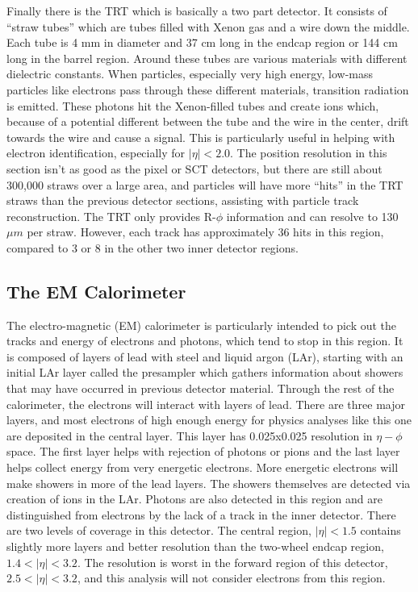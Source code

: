 Finally there is the TRT which is basically a two part detector.  It consists of ``straw tubes'' which are tubes filled with Xenon gas and a wire down the middle. Each tube is 4 mm in diameter and 37 cm long in the endcap region or 144 cm long in the barrel region.   Around these tubes are various materials with different dielectric constants.  When particles, especially very high energy, low-mass particles like electrons pass through these different materials, transition radiation is emitted.  These photons hit the Xenon-filled tubes and create ions which, because of a potential different between the tube and the wire in the center, drift towards the wire and cause a signal.  This is particularly useful in helping with electron identification, especially for $|\eta| < 2.0$.  The position resolution in this section isn't as good as the pixel or SCT detectors, but there are still about 300,000 straws over a large area, and particles will have more ``hits'' in the TRT straws than the previous detector sections, assisting with particle track reconstruction.  The TRT only provides R-$\phi$ information and can resolve to 130 $\mu m$ per straw.  However, each track has approximately 36 hits in this region, compared to 3 or 8 in the other two inner detector regions.

\subsection{The EM Calorimeter}
The electro-magnetic (EM) calorimeter is particularly intended to pick out the tracks and energy of electrons and photons, which tend to stop in this region.  It is composed of layers of lead with steel and liquid argon (LAr), starting with an initial LAr layer called the presampler which gathers information about showers that may have occurred in previous detector material.  Through the rest of the calorimeter, the electrons will interact with layers of lead.  There are three major layers, and most electrons of high enough energy for physics analyses like this one are deposited in the central layer.  This layer has 0.025x0.025 resolution in $\eta - \phi$ space.  The first layer helps with rejection of photons or pions and the last layer helps collect energy from very energetic electrons.  More energetic electrons will make showers in more of the lead layers.  The showers themselves are detected via creation of ions in the LAr.  Photons are also detected in this region and are distinguished from electrons by the lack of a track in the inner detector.  There are two levels of coverage in this detector. The central region, $|\eta| < 1.5$ contains slightly more layers and better resolution than the two-wheel endcap region, $1.4 < |\eta| < 3.2$.  The resolution is worst in the forward region of this detector, $2.5 < |\eta| < 3.2$, and this analysis will not consider electrons from this region.

